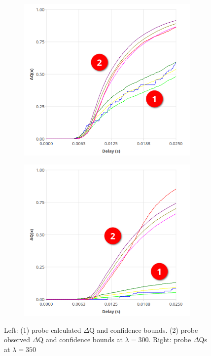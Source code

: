     \begin{figure}[H]
            \centering
            \begin{subfigure}{.5\textwidth}
                \centering
                \includegraphics[width=0.98\textwidth]{img/overload_2/300_probe2.png}
                \label{fig:high_load_1}
            \end{subfigure}%
            \begin{subfigure}{.5\textwidth}
                \centering
                \includegraphics[width =0.98\textwidth]{img/overload_2/350_probe2.png}
                \label{fig:high_load_2}
            \end{subfigure}
            \label{fig:early_ov}
            \caption{Left: (1) probe calculated $\Delta$Q and confidence bounds. (2) probe observed $\Delta$Q and confidence bounds at $\lambda = 300$. Right: probe $\Delta$Qs at $\lambda = 350$}
        \end{figure}

